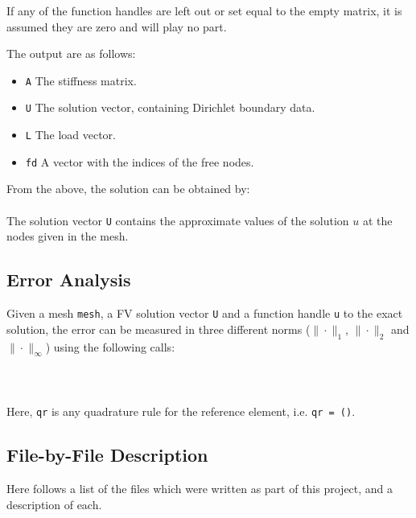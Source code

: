 If any of the function handles are left out or set equal to the empty matrix, 
it is assumed they are zero and will play no part.

The output are as follows:

\begin{itemize}
\item {\tt A} The stiffness matrix.
\item {\tt U} The solution vector, containing Dirichlet boundary data.
\item {\tt L} The load vector.
\item {\tt fd} A vector with the indices of the free nodes.
\end{itemize}

From the above, the solution can be obtained by: \\

 \\

The solution vector {\tt U} contains the approximate values of the solution $u$
at the nodes given in the mesh.

\subsection{Error Analysis}

Given a mesh {\tt mesh}, a FV solution vector {\tt U} and a function handle 
{\tt u} to the exact solution, the error can be measured in three different
norms ($\|\cdot\|_1$, $\|\cdot\|_2$ and $\|\cdot\|_\infty$) using the 
following calls: \\

 \\
 \\
 \\

Here, {\tt qr} is any quadrature rule for the reference element, i.e.
{\tt qr = ()}. 

\subsection{File-by-File Description}

Here follows a list of the files which were written as part of this project,
and a description of each.

